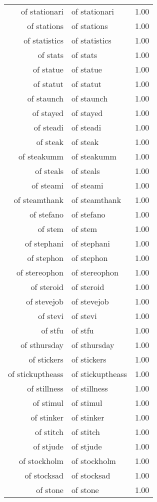 \begin{table}[ht]
\begin{tabular}{rlr}
  of stationari & of stationari & 1.00 \\ 
  of stations & of stations & 1.00 \\ 
  of statistics & of statistics & 1.00 \\ 
  of stats & of stats & 1.00 \\ 
  of statue & of statue & 1.00 \\ 
  of statut & of statut & 1.00 \\ 
  of staunch & of staunch & 1.00 \\ 
  of stayed & of stayed & 1.00 \\ 
  of steadi & of steadi & 1.00 \\ 
  of steak & of steak & 1.00 \\ 
  of steakumm & of steakumm & 1.00 \\ 
  of steals & of steals & 1.00 \\ 
  of steami & of steami & 1.00 \\ 
  of steamthank & of steamthank & 1.00 \\ 
  of stefano & of stefano & 1.00 \\ 
  of stem & of stem & 1.00 \\ 
  of stephani & of stephani & 1.00 \\ 
  of stephon & of stephon & 1.00 \\ 
  of stereophon & of stereophon & 1.00 \\ 
  of steroid & of steroid & 1.00 \\ 
  of stevejob & of stevejob & 1.00 \\ 
  of stevi & of stevi & 1.00 \\ 
  of stfu & of stfu & 1.00 \\ 
  of sthursday & of sthursday & 1.00 \\ 
  of stickers & of stickers & 1.00 \\ 
  of stickuptheass & of stickuptheass & 1.00 \\ 
  of stillness & of stillness & 1.00 \\ 
  of stimul & of stimul & 1.00 \\ 
  of stinker & of stinker & 1.00 \\ 
  of stitch & of stitch & 1.00 \\ 
  of stjude & of stjude & 1.00 \\ 
  of stockholm & of stockholm & 1.00 \\ 
  of stocksad & of stocksad & 1.00 \\ 
  of stone & of stone & 1.00 \\ 

\end{tabular}
\end{table}
